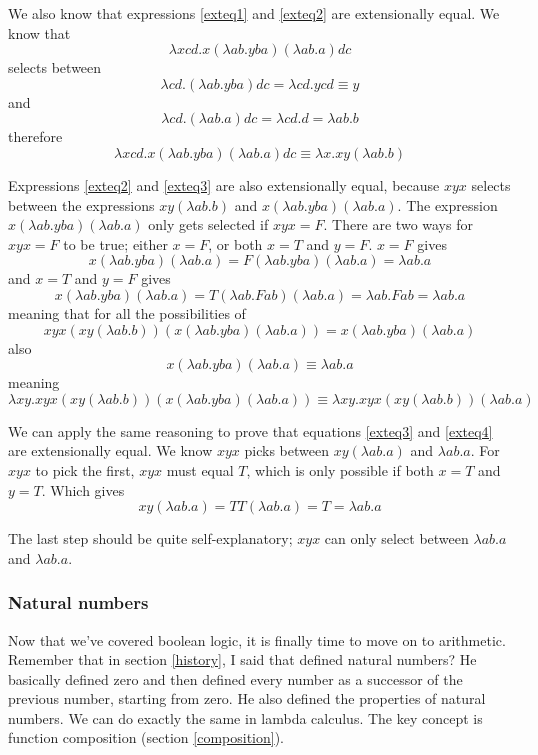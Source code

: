 \documentclass[11pt]{article}
\begin{document}
We also know that expressions \ref{exteq1} and \ref{exteq2} are extensionally
equal. We know that
\[\lambda xcd.x(\lambda ab.yba)(\lambda ab.a)dc\]
selects between
\[\lambda cd.(\lambda ab.yba)dc=\lambda cd.ycd\equiv y\]
and
\[\lambda cd.(\lambda ab.a)dc=\lambda cd.d=\lambda ab.b\]
therefore
\[\lambda xcd.x(\lambda ab.yba)(\lambda ab.a)dc\equiv\lambda x.xy(\lambda ab.b)\]

Expressions \ref{exteq2} and \ref{exteq3} are also extensionally equal, because
\(xyx\) selects between the expressions \(xy(\lambda ab.b)\) and \(x(\lambda
ab.yba)(\lambda ab.a)\). The expression \(x(\lambda ab.yba)(\lambda ab.a)\)
only gets selected if \(xyx=F\). There are two ways for \(xyx=F\) to be true;
either \(x=F\), or both \(x=T\) and \(y=F\). \(x=F\) gives
\[x(\lambda ab.yba)(\lambda ab.a)=F(\lambda ab.yba)(\lambda ab.a)=\lambda ab.a\]
and \(x=T\) and \(y=F\) gives
\[
	x(\lambda ab.yba)(\lambda ab.a)
	=T(\lambda ab.Fab)(\lambda ab.a)
	=\lambda ab.Fab
	=\lambda ab.a
\]
meaning that for all the possibilities of
\[
	xyx(xy(\lambda ab.b))(x(\lambda ab.yba)(\lambda ab.a))
	=x(\lambda ab.yba)(\lambda ab.a)
\]
also
\[x(\lambda ab.yba)(\lambda ab.a)\equiv\lambda ab.a\]
meaning
\[
	\lambda xy.xyx(xy(\lambda ab.b))(x(\lambda ab.yba)(\lambda ab.a))
	\equiv\lambda xy.xyx(xy(\lambda ab.b))(\lambda ab.a)
\]

We can apply the same reasoning to prove that equations \ref{exteq3} and
\ref{exteq4} are extensionally equal. We know \(xyx\) picks between
\(xy(\lambda ab.a)\) and \(\lambda ab.a\). For \(xyx\) to pick the first,
\(xyx\) must equal \(T\), which is only possible if both \(x=T\) and \(y=T\).
Which gives
\[xy(\lambda ab.a)=TT(\lambda ab.a)=T=\lambda ab.a\]

The last step should be quite self-explanatory; \(xyx\) can only select
between \(\lambda ab.a\) and \(\lambda ab.a\).

\subsubsection{Natural numbers}\label{natural_numbers}

Now that we've covered boolean logic, it is finally time to move on to
arithmetic. Remember that in section \ref{history}, I said that
\textcite{peano1889} defined natural numbers? He basically defined zero and
then defined every number as a successor of the previous number, starting from
zero. He also defined the properties of natural numbers. We can do exactly the
same in lambda calculus. The key concept is function composition (section
\ref{composition}).
\end{document}
